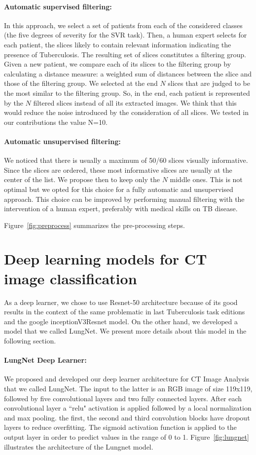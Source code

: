 \paragraph{Automatic supervised filtering:}In this approach, we select a set of patients from each of the considered classes (the five degrees of severity for the SVR task). Then, a human expert selects for each patient, the slices likely to contain relevant information indicating the presence of Tuberculosis. The resulting set of slices constitutes a filtering group. Given a new patient, we compare each of its slices to the filtering group by calculating a distance measure:  a weighted sum of distances between the slice and those of the filtering group. We selected at the end $N$ slices that are judged to be the most similar to the filtering group. So, in the end, each patient is represented by the $N$ filtered slices instead of all its extracted images. We think that this would reduce the noise introduced by the consideration of all slices. We tested in our contributions the value N=10.

\paragraph{Automatic unsupervised filtering:}We noticed that there is usually a maximum of 50/60 slices visually informative. Since the slices are ordered, these most informative slices are usually at the center of the list. We propose then to keep only the $N$ middle ones. This is not optimal but we opted for this choice for a fully automatic and unsupervised approach. This choice can be improved by performing manual filtering with the intervention of a human expert, preferably with medical skills on TB disease.

Figure~\ref{fig:preprocess} summarizes the pre-processing steps.
\section{Deep learning models for CT image classification}
As a deep learner, we chose to use Resnet-50 architecture because of its good results in the context of the same problematic in last Tuberculosis task editions~\cite{sgeast17} and the google inceptionV3Resnet model. On the other hand, we developed a model that we called LungNet. We present more details about this model in the following section.

\paragraph{LungNet Deep Learner:}We proposed and developed our deep learner architecture for CT Image Analysis that we called LungNet. The input to the latter is an RGB image of size 119x119, followed by five convolutional layers and two fully connected layers. After each convolutional layer a ``relu" activation is applied followed by a local normalization and max pooling. the first, the second and third convolution blocks have dropout layers to reduce overfitting. The sigmoid activation function is applied to the output layer in order to predict values in the range of 0 to 1. Figure~\ref{fig:lungnet} illustrates the architecture of the Lungnet model.

